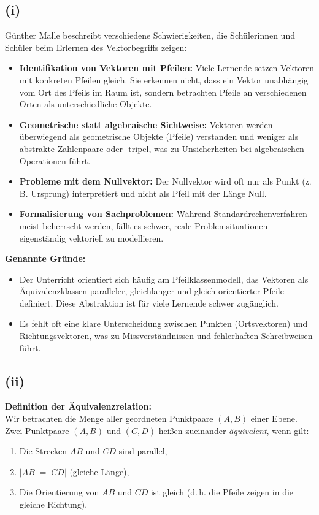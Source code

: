 \documentclass[12pt,a4paper]{article}
\begin{document}
\subsection*{(i)}

Günther Malle beschreibt verschiedene Schwierigkeiten, die Schülerinnen und Schüler beim Erlernen des Vektorbegriffs zeigen:

\begin{itemize}
    \item \textbf{Identifikation von Vektoren mit Pfeilen:} Viele Lernende setzen Vektoren mit konkreten Pfeilen gleich. Sie erkennen nicht, dass ein Vektor unabhängig vom Ort des Pfeils im Raum ist, sondern betrachten Pfeile an verschiedenen Orten als unterschiedliche Objekte.
    \item \textbf{Geometrische statt algebraische Sichtweise:} Vektoren werden überwiegend als geometrische Objekte (Pfeile) verstanden und weniger als abstrakte Zahlenpaare oder -tripel, was zu Unsicherheiten bei algebraischen Operationen führt.
    \item \textbf{Probleme mit dem Nullvektor:} Der Nullvektor wird oft nur als Punkt (z.\,B. Ursprung) interpretiert und nicht als Pfeil mit der Länge Null.
    \item \textbf{Formalisierung von Sachproblemen:} Während Standardrechenverfahren meist beherrscht werden, fällt es schwer, reale Problemsituationen eigenständig vektoriell zu modellieren.
\end{itemize}

\noindent \textbf{Genannte Gründe:}
\begin{itemize}
    \item Der Unterricht orientiert sich häufig am Pfeilklassenmodell, das Vektoren als Äquivalenzklassen paralleler, gleichlanger und gleich orientierter Pfeile definiert. Diese Abstraktion ist für viele Lernende schwer zugänglich.
    \item Es fehlt oft eine klare Unterscheidung zwischen Punkten (Ortsvektoren) und Richtungsvektoren, was zu Missverständnissen und fehlerhaften Schreibweisen führt.
\end{itemize}

\newpage 
\subsection*{(ii)}
\noindent \textbf{Definition der Äquivalenzrelation:}\\
Wir betrachten die Menge aller geordneten Punktpaare $(A, B)$ einer Ebene.\\
\noindent Zwei Punktpaare $(A, B)$ und $(C, D)$ heißen zueinander \emph{äquivalent}, wenn gilt:
\begin{enumerate}
    \item Die Strecken $AB$ und $CD$ sind parallel,
    \item $|AB| = |CD|$ (gleiche Länge),
    \item Die Orientierung von $AB$ und $CD$ ist gleich (d.\,h. die Pfeile zeigen in die gleiche Richtung).
\end{enumerate}
\end{document}
